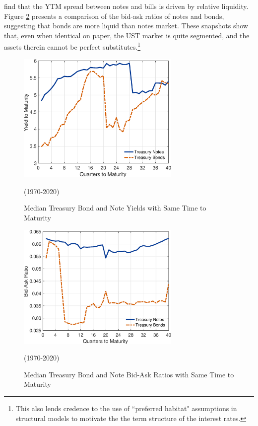 \documentclass[11pt,a4paper,margin=1.5in]{article}
\begin{document}
\citet{Amihud-Mendelson:1991} find that the YTM spread between notes and bills is driven by relative liquidity.
Figure \ref{fig:BidAsk_Ratios} presents a comparison of the bid-ask ratios of notes and bonds, suggesting that bonds are more liquid than notes market.
These snapshots show that, even when identical on paper, the UST market is quite segmented, and the assets therein cannot be perfect substitutes.\footnote{
	This also lends credence to the use of ``preferred habitat" assumptions in structural models to motivate the the term structure of the interest rates.}

\begin{figure}[p]
\centering
\includegraphics[width=0.7\textwidth]{../Figures/BondNote_Spread.eps}
\caption{Median Treasury Bond and Note Yields with Same Time to Maturity}{(1970-2020)}
\label{fig:YTM_Spread}
\end{figure}
\begin{figure}[p]
\centering
\includegraphics[width=0.7\textwidth]{../Figures/BidAsk_Ratios.eps}
\caption{Median Treasury Bond and Note Bid-Ask Ratios with Same Time to Maturity}{(1970-2020)}
\label{fig:BidAsk_Ratios}
\end{figure}
\end{document}
